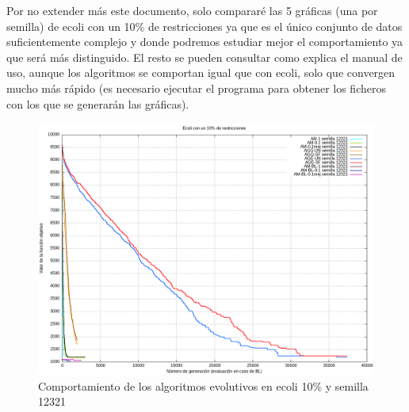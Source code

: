 \documentclass[12pt, spanish]{article}
\begin{document}
Por no extender más este documento, solo compararé las 5 gráficas (una por semilla) de ecoli con un 10\% de restricciones ya que es el único conjunto de datos suficientemente complejo y donde podremos estudiar mejor el comportamiento ya que será más distinguido. El resto se pueden consultar como explica el manual de uso, aunque los algoritmos se comportan igual que con ecoli, solo que convergen mucho más rápido (es necesario ejecutar el programa para obtener los ficheros con los que se generarán las gráficas).

\begin{figure}[H]
  \centering
      \includegraphics[scale = 0.50]{ecoli_set_const_10_12321.png}
 		 \caption{Comportamiento de los algoritmos evolutivos en ecoli 10\% y semilla 12321}
  		\label{fig:ej1-f4}

\end{figure}
\end{document}
